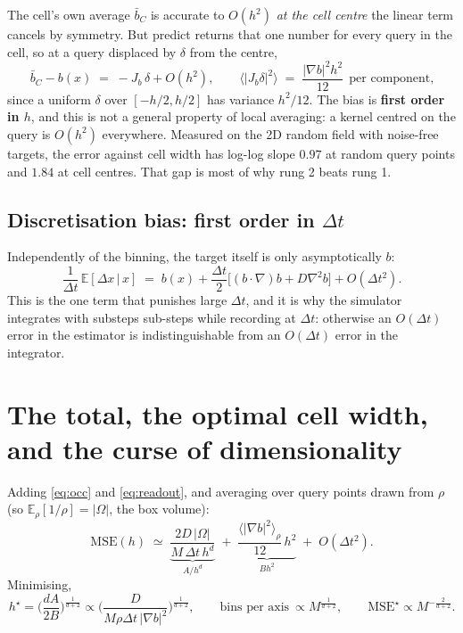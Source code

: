 \documentclass[11pt,a4paper]{article}
\newcommand{\code}[1]{{\ttfamily\small #1}}
\newcommand{\dx}{\Delta x}
\newcommand{\dt}{\Delta t}
\newcommand{\E}{\mathbb{E}}
\begin{document}
The cell's own average $\bar b_C$ is accurate to $O(h^{2})$ \emph{at the cell centre}
\textemdash{} the linear term cancels by symmetry. But \code{predict} returns that one
number for every query in the cell, so at a query displaced by $\delta$ from the centre,
\begin{equation}
  \bar b_C - b(x) \;=\; -J_b\,\delta + O(h^{2}),
  \qquad
  \big\langle |J_b\delta|^{2}\big\rangle \;=\; \frac{|\nabla b|^{2}h^{2}}{12}
  \ \ \text{per component,}
  \label{eq:readout}
\end{equation}
since a uniform $\delta$ over $[-h/2,h/2]$ has variance $h^{2}/12$. The bias is
\textbf{first order in $h$}, and this is not a general property of local averaging: a
kernel centred on the query is $O(h^{2})$ everywhere. Measured on the 2D random field
with noise-free targets, the error against cell width has log-log slope $0.97$ at random
query points and $1.84$ at cell centres. That gap is most of why rung 2 beats rung 1.

\subsection{Discretisation bias: first order in $\dt$}

Independently of the binning, the target itself is only asymptotically $b$:
\begin{equation}
  \frac{1}{\dt}\,\E[\dx\,|\,x] \;=\; b(x) + \frac{\dt}{2}\Big[(b\!\cdot\!\nabla)b + D\nabla^{2}b\Big] + O(\dt^{2}) .
\end{equation}
This is the one term that punishes large $\dt$, and it is why the simulator integrates
with \code{substeps} sub-steps while recording at $\dt$: otherwise an $O(\dt)$ error in
the estimator is indistinguishable from an $O(\dt)$ error in the integrator.

\section{The total, the optimal cell width, and the curse of dimensionality}

Adding \eqref{eq:occ} and \eqref{eq:readout}, and averaging over query points drawn
from $\rho$ (so $\E_\rho[1/\rho]=|\Omega|$, the box volume):
\begin{equation}\boxed{
  \mathrm{MSE}(h)\;\simeq\;\underbrace{\frac{2D\,|\Omega|}{M\,\dt\,h^{d}}}_{A/h^{d}}
  \;+\;\underbrace{\frac{\langle|\nabla b|^{2}\rangle_\rho}{12}\,h^{2}}_{B h^{2}}
  \;+\;O(\dt^{2}) .
  \label{eq:total}
}\end{equation}
Minimising,
\begin{equation}
  h^{\star}=\Big(\frac{dA}{2B}\Big)^{\frac{1}{d+2}}\propto
  \Big(\frac{D}{M\rho\dt\,|\nabla b|^{2}}\Big)^{\frac{1}{d+2}},
  \qquad
  \text{bins per axis}\ \propto M^{\frac{1}{d+2}},
  \qquad
  \mathrm{MSE}^{\star}\propto M^{-\frac{2}{d+2}} .
  \label{eq:opt}
\end{equation}
\end{document}
